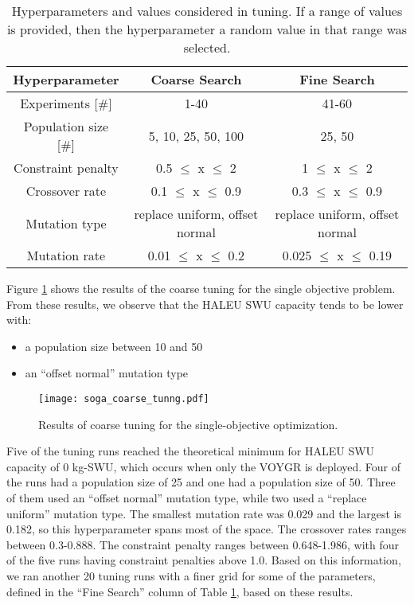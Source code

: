 \begin{table}
    \centering 
    \caption{Hyperparameters and values considered in tuning. If a range 
    of values is provided, then the hyperparameter a random value in 
    that range was selected.}
    \label{tab:soga_tuning}
    \begin{tabular}{c c c}
        \hline
        Hyperparameter & Coarse Search & Fine Search \\
        \hline 
        Experiments [\#] & 1-40 & 41-60 \\
        Population size [\#] & 5, 10, 25, 50, 100 & 25, 50\\
        Constraint penalty & 0.5 $\leq$ x $\leq$ 2 & 1 $\leq$ x $\leq$ 2\\
        Crossover rate & 0.1 $\leq$ x $\leq$ 0.9 & 0.3 $\leq$ x $\leq$ 0.9\\
        Mutation type & replace uniform, offset normal & replace uniform, offset normal\\
        Mutation rate & 0.01 $\leq$ x $\leq$ 0.2 & 0.025 $\leq$ x $\leq$ 0.19\\
        \hline       
    \end{tabular}
\end{table}


Figure \ref{fig:soga_coarse_tuning} shows the results of the coarse tuning 
for the single objective problem. From these results, we observe that the 
\gls{HALEU} \gls{SWU} capacity tends to be lower with:
\begin{itemize}
    \item a population size between 10 and 50
    \item an ``offset normal'' mutation type
\end{itemize}

\begin{figure}
    \texttt{[image: soga\_coarse\_tunng.pdf]}
    \caption{Results of coarse tuning for the single-objective 
    optimization.}
    \label{fig:soga_coarse_tuning}
\end{figure}

Five of the tuning runs reached the theoretical minimum for \gls{HALEU} \gls{SWU} 
capacity of 0 kg-SWU, which occurs when only the VOYGR is deployed. Four of the 
runs had a population size of 25 and one had a population size of 50. Three of 
them used an ``offset normal'' mutation 
type, while two used a ``replace uniform'' mutation type. The smallest mutation 
rate was 0.029 and the largest is 0.182, so this hyperparameter spans most of 
the space. The crossover rates ranges between 0.3-0.888. The constraint 
penalty ranges between 0.648-1.986, with four of the five runs having constraint 
penalties above 1.0. Based on this information, we ran another 20 tuning runs with 
a finer grid for some of the parameters, defined in the ``Fine Search'' column of 
Table \ref{tab:soga_tuning}, based on these results. 

